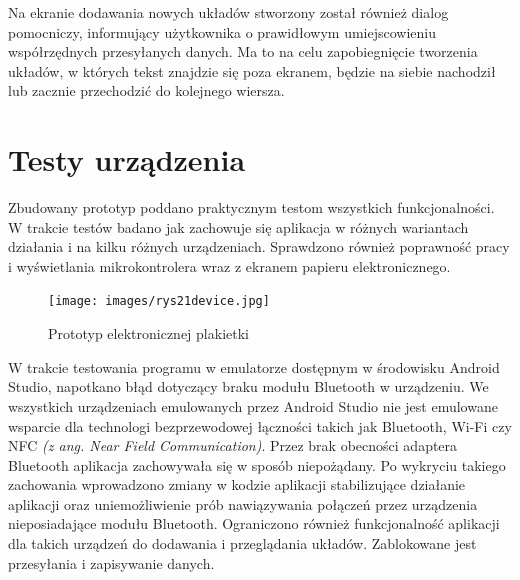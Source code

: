 \documentclass[a4paper,12pt, twoside]{article}
\begin{document}
    	
    	Na ekranie dodawania nowych układów stworzony został również dialog pomocniczy, informujący użytkownika o prawidłowym umiejscowieniu współrzędnych przesyłanych danych. Ma to na celu zapobiegnięcie tworzenia układów, w których tekst znajdzie się poza ekranem, będzie na siebie nachodził lub zacznie przechodzić do kolejnego wiersza.
    	

    	\section{Testy urządzenia}
    	Zbudowany prototyp poddano praktycznym testom wszystkich funkcjonalności. W trakcie testów badano jak zachowuje się aplikacja w różnych wariantach działania i na kilku różnych urządzeniach. Sprawdzono również poprawność pracy i wyświetlania mikrokontrolera wraz z ekranem papieru elektronicznego.
    	
    	\begin{figure}[H]
    	        \centering
    	        \vspace{.5cm}
    			\texttt{[image: images/rys21device.jpg]}
    			\vspace{.5cm}
    		    \caption{Prototyp elektronicznej plakietki}
                \label{fig:device}
    	\end{figure}
    	
    	W trakcie testowania programu w emulatorze dostępnym w środowisku Android Studio, napotkano błąd dotyczący braku modułu Bluetooth w urządzeniu. We wszystkich urządzeniach emulowanych przez Android Studio nie jest emulowane wsparcie dla technologi bezprzewodowej łączności takich jak Bluetooth, Wi-Fi czy NFC \textit{(z ang. Near Field Communication)}. Przez brak obecności adaptera Bluetooth aplikacja zachowywała się w sposób niepożądany. Po wykryciu takiego zachowania wprowadzono zmiany w kodzie aplikacji stabilizujące działanie aplikacji oraz uniemożliwienie prób nawiązywania połączeń przez urządzenia nieposiadające modułu Bluetooth. Ograniczono również funkcjonalność aplikacji dla takich urządzeń do dodawania i przeglądania układów. Zablokowane jest przesyłania i zapisywanie danych.
    	
\end{document}
